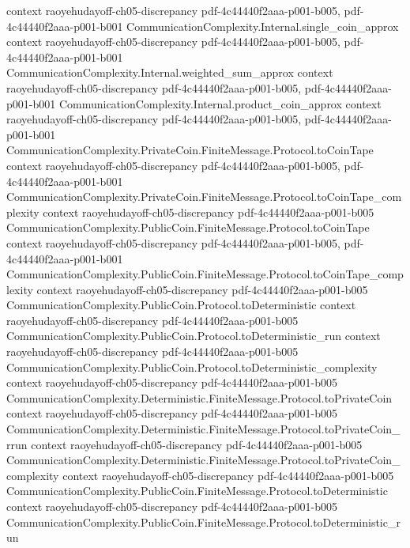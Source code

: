 \begin{lemma}
  {context}
  {raoyehudayoff-ch05-discrepancy}
  {pdf-4c44440f2aaa-p001-b005,
    pdf-4c44440f2aaa-p001-b001}
\proofstep
  {CommunicationComplexity.Internal.single_coin_approx}
  {context}
  {raoyehudayoff-ch05-discrepancy}
  {pdf-4c44440f2aaa-p001-b005,
    pdf-4c44440f2aaa-p001-b001}
\proofstep
  {CommunicationComplexity.Internal.weighted_sum_approx}
  {context}
  {raoyehudayoff-ch05-discrepancy}
  {pdf-4c44440f2aaa-p001-b005,
    pdf-4c44440f2aaa-p001-b001}
\proofstep
  {CommunicationComplexity.Internal.product_coin_approx}
  {context}
  {raoyehudayoff-ch05-discrepancy}
  {pdf-4c44440f2aaa-p001-b005,
    pdf-4c44440f2aaa-p001-b001}
\proofstep
  {CommunicationComplexity.PrivateCoin.FiniteMessage.Protocol.toCoinTape}
  {context}
  {raoyehudayoff-ch05-discrepancy}
  {pdf-4c44440f2aaa-p001-b005,
    pdf-4c44440f2aaa-p001-b001}
\proofstep
  {CommunicationComplexity.PrivateCoin.FiniteMessage.Protocol.toCoinTape_complexity}
  {context}
  {raoyehudayoff-ch05-discrepancy}
  {pdf-4c44440f2aaa-p001-b005}
\proofstep
  {CommunicationComplexity.PublicCoin.FiniteMessage.Protocol.toCoinTape}
  {context}
  {raoyehudayoff-ch05-discrepancy}
  {pdf-4c44440f2aaa-p001-b005,
    pdf-4c44440f2aaa-p001-b001}
\proofstep
  {CommunicationComplexity.PublicCoin.FiniteMessage.Protocol.toCoinTape_complexity}
  {context}
  {raoyehudayoff-ch05-discrepancy}
  {pdf-4c44440f2aaa-p001-b005}
\proofstep
  {CommunicationComplexity.PublicCoin.Protocol.toDeterministic}
  {context}
  {raoyehudayoff-ch05-discrepancy}
  {pdf-4c44440f2aaa-p001-b005}
\proofstep
  {CommunicationComplexity.PublicCoin.Protocol.toDeterministic_run}
  {context}
  {raoyehudayoff-ch05-discrepancy}
  {pdf-4c44440f2aaa-p001-b005}
\proofstep
  {CommunicationComplexity.PublicCoin.Protocol.toDeterministic_complexity}
  {context}
  {raoyehudayoff-ch05-discrepancy}
  {pdf-4c44440f2aaa-p001-b005}
\proofstep
  {CommunicationComplexity.Deterministic.FiniteMessage.Protocol.toPrivateCoin}
  {context}
  {raoyehudayoff-ch05-discrepancy}
  {pdf-4c44440f2aaa-p001-b005}
\proofstep
  {CommunicationComplexity.Deterministic.FiniteMessage.Protocol.toPrivateCoin_rrun}
  {context}
  {raoyehudayoff-ch05-discrepancy}
  {pdf-4c44440f2aaa-p001-b005}
\proofstep
  {CommunicationComplexity.Deterministic.FiniteMessage.Protocol.toPrivateCoin_complexity}
  {context}
  {raoyehudayoff-ch05-discrepancy}
  {pdf-4c44440f2aaa-p001-b005}
\proofstep
  {CommunicationComplexity.PublicCoin.FiniteMessage.Protocol.toDeterministic}
  {context}
  {raoyehudayoff-ch05-discrepancy}
  {pdf-4c44440f2aaa-p001-b005}
\proofstep
  {CommunicationComplexity.PublicCoin.FiniteMessage.Protocol.toDeterministic_run}

\end{lemma}
